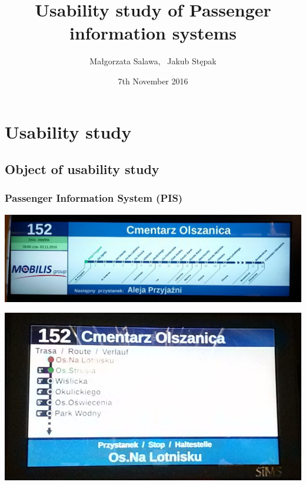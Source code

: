 \documentclass{beamer}
\title
[Passenger information systems in Cracow Public Transport]
{Usability study of Passenger information systems}
\author
[M.Salawa, J. Stępak]
{Małgorzata Salawa, \ Jakub Stępak}
\institute
[AGH]
{
AGH University of Science and Technology

}
\date{7th November 2016}
\begin{document}
\frame{\titlepage}


\section{Usability study}

\subsection{Object of usability study}

\begin{frame}

\frametitle{Passenger Information System (PIS)}
\begin{center}

\includegraphics[width=0.8\paperwidth]{sip1.jpg}

\includegraphics[width=0.4\paperwidth]{sip2.jpg}

\end{center}

\end{frame}
\end{document}

